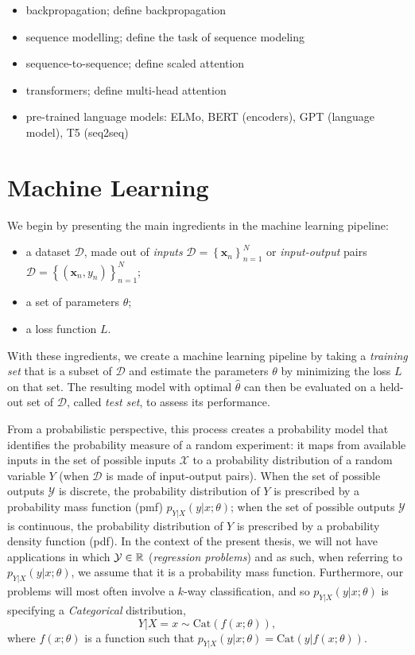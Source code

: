 \begin{itemize}
    \item backpropagation; define backpropagation
    \item sequence modelling; define the task of sequence modeling
    \item sequence-to-sequence; define scaled attention
    \item transformers; define multi-head attention
    \item pre-trained language models: ELMo, BERT (encoders), GPT (language model), T5 (seq2seq)
\end{itemize}

\section{Machine Learning}
\label{sec:ml-primer}

We begin by presenting the main ingredients in the machine learning pipeline:
%
\begin{itemize}
    \item a dataset $\mathcal{D}$, made out of
          \textit{inputs} $\mathcal{D}=\left\{\bm{x}_n\right\}_{n=1}^N$ or
          \textit{input-output} pairs
          $\mathcal{D}=\left\{(\bm{x}_n,y_n)\right\}_{n=1}^N$;
    \item a set of parameters $\theta$;
    \item a loss function $L$.
\end{itemize}
%
With these ingredients, we create a machine learning pipeline by
taking a \textit{training set} that is a subset of $\mathcal{D}$ and estimate
the parameters $\theta$ by minimizing the loss
$L$ on that set. The resulting model with optimal
$\hat{\theta}$ can then be evaluated on a held-out set of
$\mathcal{D}$, called \textit{test set}, to assess its performance.

From a probabilistic perspective, this process creates a probability model
that identifies the probability measure of a random experiment:
it maps from available inputs in the set of possible inputs $\mathcal{X}$ to a probability
distribution of a random variable $Y$ (when $\mathcal D$ is made of input-output pairs).
When the set of possible outputs $\mathcal{Y}$ is discrete, the probability
distribution of $Y$ is prescribed by a probability mass function (pmf) $p_{Y|X}(y|x;\theta)$;
when the set of possible outputs $\mathcal{Y}$ is continuous, the probability
distribution of $Y$ is prescribed by a probability density function (pdf).
In the context of the present thesis, we will not have applications in which
$\mathcal{Y}\in\mathbb{R}$ (\ie \textit{regression problems}) and as such,
when referring to $p_{Y|X}(y|x;\theta)$, we assume that it is a
probability mass function. Furthermore, our problems will
most often involve a $k$-way classification, and so
$p_{Y|X}(y|x;\theta)$ is specifying a \textit{Categorical} distribution,
%
\begin{equation}
    Y|X\!\!=\!x \sim \text{Cat}(f(x; \theta)),
\end{equation}
%
where $f(x; \theta)$ is a function such that
$p_{Y|X}(y|x;\theta)=\text{Cat}(y|f(x; \theta))$.


